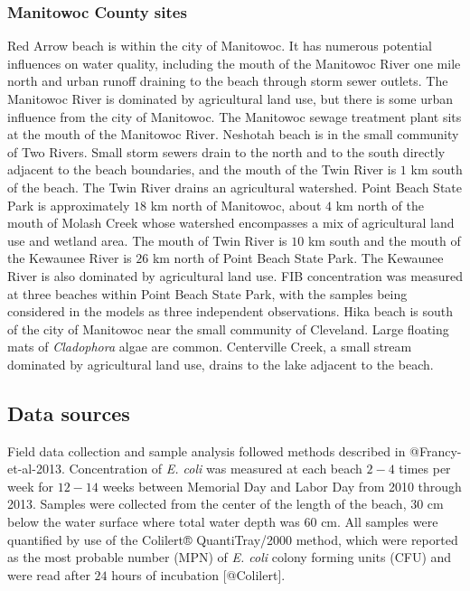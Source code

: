 \subsubsection{Manitowoc County sites}\label{manitowoc-county-sites}

Red Arrow beach is within the city of Manitowoc. It has numerous
potential influences on water quality, including the mouth of the
Manitowoc River one mile north and urban runoff draining to the beach
through storm sewer outlets. The Manitowoc River is dominated by
agricultural land use, but there is some urban influence from the city
of Manitowoc. The Manitowoc sewage treatment plant sits at the mouth of
the Manitowoc River. Neshotah beach is in the small community of Two
Rivers. Small storm sewers drain to the north and to the south directly
adjacent to the beach boundaries, and the mouth of the Twin River is
\(1\) km south of the beach. The Twin River drains an agricultural
watershed. Point Beach State Park is approximately \(18\) km north of
Manitowoc, about \(4\) km north of the mouth of Molash Creek whose
watershed encompasses a mix of agricultural land use and wetland area.
The mouth of Twin River is \(10\) km south and the mouth of the Kewaunee
River is \(26\) km north of Point Beach State Park. The Kewaunee River
is also dominated by agricultural land use. FIB concentration was
measured at three beaches within Point Beach State Park, with the
samples being considered in the models as three independent
observations. Hika beach is south of the city of Manitowoc near the
small community of Cleveland. Large floating mats of \emph{Cladophora}
algae are common. Centerville Creek, a small stream dominated by
agricultural land use, drains to the lake adjacent to the beach.

\subsection{Data sources}\label{data-sources}

Field data collection and sample analysis followed methods described in
@Francy-et-al-2013. Concentration of \emph{E. coli} was measured at each
beach \(2-4\) times per week for \(12-14\) weeks between Memorial Day
and Labor Day from 2010 through 2013. Samples were collected from the
center of the length of the beach, \(30\) cm below the water surface
where total water depth was \(60\) cm. All samples were quantified by
use of the Colilert® QuantiTray/2000 method, which were reported as the
most probable number (MPN) of \emph{E. coli} colony forming units (CFU)
and were read after \(24\) hours of incubation {[}@Colilert{]}.

